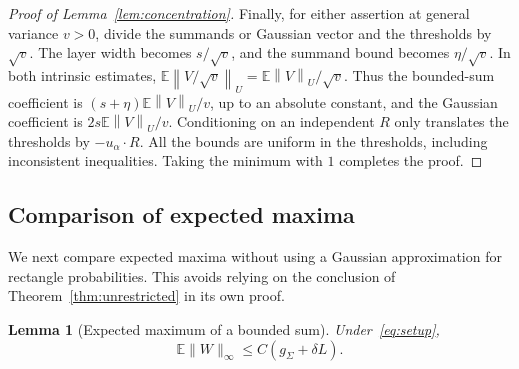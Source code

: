 \documentclass[11pt,letterpaper]{article}
\newenvironment{vSixBlock}{\color{magenta}}{}
\newtheorem{lemma}{Lemma}
\theoremstyle{remark}
\newcommand{\E}{\mathbb E}
\newcommand{\norm}[1]{\left\lVert#1\right\rVert}
\begin{document}
\begin{proof}[Proof of Lemma~\ref{lem:concentration}]
Finally, for either assertion at general variance \(v>0\), divide
the summands or Gaussian vector and the thresholds by \(\sqrt v\).
The layer width becomes \(s/\sqrt v\), and the summand bound becomes
\(\eta/\sqrt v\). In both intrinsic estimates,
\(\E\norm{V/\sqrt v}_U=\E\norm{V}_U/\sqrt v\). Thus the
bounded-sum coefficient is \((s+\eta)\E\norm{V}_U/v\), up to
an absolute constant, and the Gaussian coefficient is
\(2s\E\norm{V}_U/v\).
Conditioning on an independent \(R\) only
translates the thresholds by \(-u_\alpha\cdot R\). All the bounds
are uniform in the thresholds, including inconsistent inequalities.
Taking the minimum with \(1\) completes the proof.
\end{proof}


\begin{vSixBlock}
\subsection{Comparison of expected maxima}

We next compare expected maxima without using a Gaussian approximation
for rectangle probabilities. This avoids relying on the conclusion of
Theorem~\ref{thm:unrestricted} in its own proof.

\begin{lemma}[Expected maximum of a bounded sum]
\label{intrinsic:lem:maximum}
Under~\eqref{eq:setup},
\begin{equation}\label{intrinsic:eq:maximum}
 \E\|W\|_\infty\le C(g_\Sigma+\delta L).
\end{equation}
\end{lemma}


\end{vSixBlock}
\end{document}
